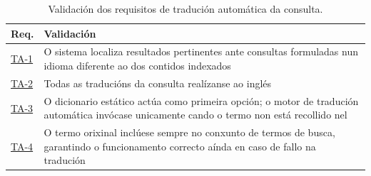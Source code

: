 \documentclass[%
    a4paper,               %
    twoside,               %
    10pt,                  %
]{article}                 %
\begin{document}
\begin{table}[h]
    \centering
    \begin{tabular}{p{1.5cm} p{\dimexpr\linewidth-1.5cm-4\tabcolsep\relax}}
        \hline
        \textbf{Req.}            & \textbf{Validación}                                                                                                                        \\
        \hline
        \hyperref[req:ta1]{TA-1} & O sistema localiza resultados pertinentes ante consultas formuladas nun idioma diferente ao dos contidos indexados                         \\
        \hyperref[req:ta2]{TA-2} & Todas as traducións da consulta realízanse ao inglés                                                                                       \\
        \hyperref[req:ta3]{TA-3} & O dicionario estático actúa como primeira opción; o motor de tradución automática invócase unicamente cando o termo non está recollido nel \\
        \hyperref[req:ta4]{TA-4} & O termo orixinal inclúese sempre no conxunto de termos de busca, garantindo o funcionamento correcto aínda en caso de fallo na tradución   \\
        \hline
    \end{tabular}
    \caption{Validación dos requisitos de tradución automática da consulta.}
    \label{tab:validacion_traduccion}
\end{table}
\end{document}
